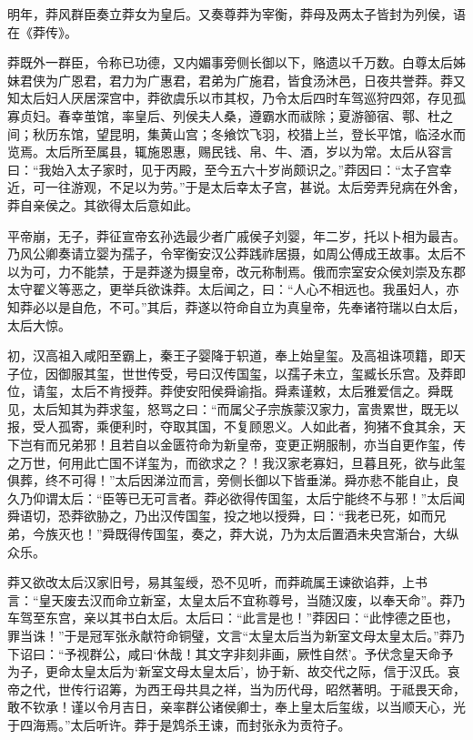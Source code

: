 \documentclass[12pt,UTF8]{ctexbook}
\begin{document}
明年，莽风群臣奏立莽女为皇后。又奏尊莽为宰衡，莽母及两太子皆封为列侯，语在《莽传》。



莽既外一群臣，令称已功德，又内媚事旁侧长御以下，赂遗以千万数。白尊太后姊妹君侠为广恩君，君力为广惠君，君弟为广施君，皆食汤沐邑，日夜共誉莽。莽又知太后妇人厌居深宫中，莽欲虞乐以市其权，乃令太后四时车驾巡狩四郊，存见孤寡贞妇。春幸茧馆，率皇后、列侯夫人桑，遵霸水而祓除；夏游篽宿、鄠、杜之间；秋历东馆，望昆明，集黄山宫；冬飨饮飞羽，校猎上兰，登长平馆，临泾水而览焉。太后所至属县，辄施恩惠，赐民钱、帛、牛、酒，岁以为常。太后从容言曰：“我始入太子家时，见于丙殿，至今五六十岁尚颇识之。”莽因曰：“太子宫幸近，可一往游观，不足以为劳。”于是太后幸太子宫，甚说。太后旁弄兒病在外舍，莽自亲侯之。其欲得太后意如此。



平帝崩，无子，莽征宣帝玄孙选最少者广戚侯子刘婴，年二岁，托以卜相为最吉。乃风公卿奏请立婴为孺子，令宰衡安汉公莽践祚居摄，如周公傅成王故事。太后不以为可，力不能禁，于是莽遂为摄皇帝，改元称制焉。俄而宗室安众侯刘崇及东郡太守翟义等恶之，更举兵欲诛莽。太后闻之，曰：“人心不相远也。我虽妇人，亦知莽必以是自危，不可。”其后，莽遂以符命自立为真皇帝，先奉诸符瑞以白太后，太后大惊。



初，汉高祖入咸阳至霸上，秦王子婴降于轵道，奉上始皇玺。及高祖诛项籍，即天子位，因御服其玺，世世传受，号曰汉传国玺，以孺子未立，玺臧长乐宫。及莽即位，请玺，太后不肯授莽。莽使安阳侯舜谕指。舜素谨敕，太后雅爱信之。舜既见，太后知其为莽求玺，怒骂之曰：“而属父子宗族蒙汉家力，富贵累世，既无以报，受人孤寄，乘便利时，夺取其国，不复顾恩义。人如此者，狗猪不食其余，天下岂有而兄弟邪！且若自以金匮符命为新皇帝，变更正朔服制，亦当自更作玺，传之万世，何用此亡国不详玺为，而欲求之？！我汉家老寡妇，旦暮且死，欲与此玺俱葬，终不可得！”太后因涕泣而言，旁侧长御以下皆垂涕。舜亦悲不能自止，良久乃仰谓太后：“臣等已无可言者。莽必欲得传国玺，太后宁能终不与邪！”太后闻舜语切，恐莽欲胁之，乃出汉传国玺，投之地以授舜，曰：“我老已死，如而兄弟，今族灭也！”舜既得传国玺，奏之，莽大说，乃为太后置酒未央宫渐台，大纵众乐。



莽又欲改太后汉家旧号，易其玺绶，恐不见听，而莽疏属王谏欲谄莽，上书言：“皇天废去汉而命立新室，太皇太后不宜称尊号，当随汉废，以奉天命”。莽乃车驾至东宫，亲以其书白太后。太后曰：“此言是也！”莽因曰：“此悖德之臣也，罪当诛！”于是冠军张永献符命铜璧，文言“太皇太后当为新室文母太皇太后。”莽乃下诏曰：“予视群公，咸曰‘休哉！其文字非刻非画，厥性自然’。予伏念皇天命予为子，更命太皇太后为‘新室文母太皇太后’，协于新、故交代之际，信于汉氏。哀帝之代，世传行诏筹，为西王母共具之祥，当为历代母，昭然著明。于祗畏天命，敢不钦承！谨以令月吉日，亲率群公诸侯卿士，奉上皇太后玺绂，以当顺天心，光于四海焉。”太后听许。莽于是鸩杀王谏，而封张永为贡符子。
\end{document}
